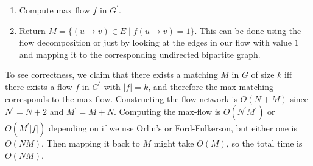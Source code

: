 \begin{example}
\begin{enumerate}
      \item Compute max flow $f$ in $G^\prime$. 
      \item Return $M = \{ (u \rightarrow v) \in E \mid f(u \rightarrow v) = 1 \}$. This can be done using the flow decomposition or just by looking at the edges in our flow with value $1$ and mapping it to the corresponding undirected bipartite graph. 
    \end{enumerate}
    To see correctness, we claim that there exists a matching $M$ in $G$ of size $k$ iff there exists a flow $f$ in $G^\prime$ with $|f|= k$, and therefore the max matching corresponds to the max flow. Constructing the flow network is $O(N + M)$ since $N^\prime = N + 2$ and $M^\prime = M + N$. Computing the max-flow is $O(N^\prime M^\prime)$ or $O(M^\prime |f|)$ depending on if we use Orlin's or Ford-Fulkerson, but either one is $O(NM)$. Then mapping it back to $M$ might take $O(M)$, so the total time is $O(NM)$. 
  \end{example}

